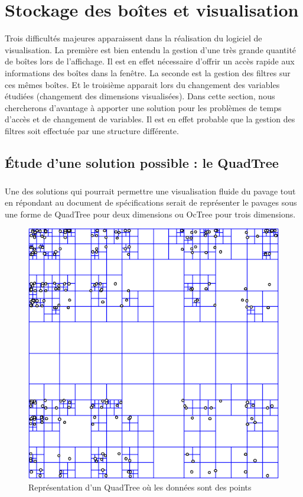 \chapter{Stockage des boîtes et visualisation}
Trois difficultés majeures apparaissent dans la réalisation du logiciel de visualisation. La première est bien entendu la gestion d'une très grande quantité de boîtes lors de l'affichage. Il est en effet nécessaire d'offrir un accès rapide aux informations des boîtes dans la fenêtre. La seconde est la gestion des filtres sur ces mêmes boîtes. Et le troisième apparait lors du changement des variables étudiées (changement des dimensions visualisées). Dans cette section, nous chercherons d'avantage à apporter une solution pour les problèmes de temps d'accès et de changement de variables. Il est en effet probable que la gestion des filtres soit effectuée par une structure différente.

\section{\'Etude d'une solution possible : le QuadTree}
\paragraph{}Une des solutions qui pourrait permettre une visualisation fluide du pavage tout en répondant au document de spécifications serait de représenter le pavages sous une forme de QuadTree pour deux dimensions ou OcTree pour trois dimensions.
\begin{figure}[htbp]
\centering
\includegraphics[scale=0.50]{quadtree}
\caption{Représentation d'un QuadTree où les données sont des points}
\end{figure}

